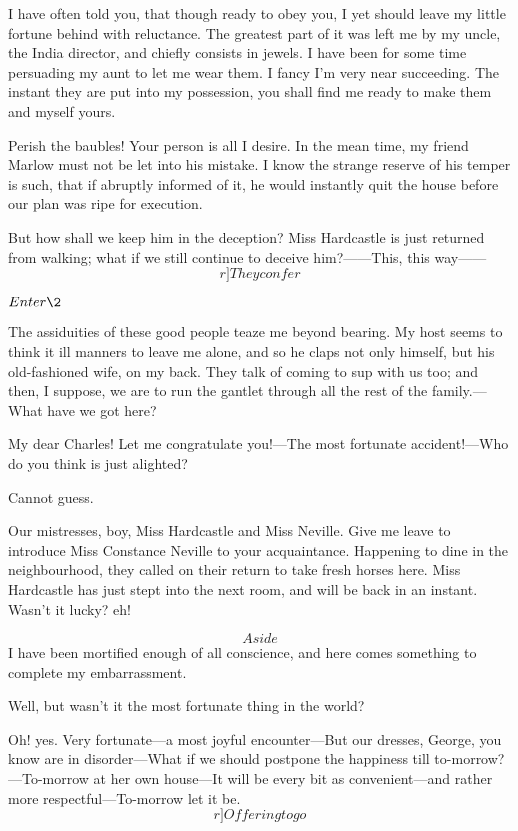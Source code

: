 \documentclass{book}
\begin{document}
\9  I have often told you, that though ready to obey you, I
yet should leave my little fortune behind with reluctance.  The
greatest part of it was left me by my uncle, the India director, and
chiefly consists in jewels.  I have been for some time persuading my
aunt to let me wear them.  I fancy I'm very near succeeding.  The
instant they are put into my possession, you shall find me ready to
make them and myself yours.

\4  Perish the baubles!  Your person is all I desire.  In the
mean time, my friend Marlow must not be let into his mistake.  I know
the strange reserve of his temper is such, that if abruptly informed of
it, he would instantly quit the house before our plan was ripe for
execution.

\9  But how shall we keep him in the deception?  Miss
Hardcastle is just returned from walking; what if we still continue to
deceive him?------This, this way------\[r]They confer\]


\(Enter \2\)


\2  The assiduities of these good people teaze me beyond bearing. 
My host seems to think it ill manners to leave me alone, and so he
claps not only himself, but his old-fashioned wife, on my back.  They
talk of coming to sup with us too; and then, I suppose, we are to run
the gantlet through all the rest of the family.---What have we got here?

\4  My dear Charles!  Let me congratulate you!---The most
fortunate accident!---Who do you think is just alighted?

\2  Cannot guess.

\4  Our mistresses, boy, Miss Hardcastle and Miss Neville. 
Give me leave to introduce Miss Constance Neville to your
acquaintance.  Happening to dine in the neighbourhood, they called on
their return to take fresh horses here.  Miss Hardcastle has just stept
into the next room, and will be back in an instant.  Wasn't it lucky? 
eh!

\2  \[Aside\]  I have been mortified enough of all conscience, and
here comes something to complete my embarrassment.

\4  Well, but wasn't it the most fortunate thing in the world?

\2  Oh! yes.  Very fortunate---a most joyful encounter---But our
dresses, George, you know are in disorder---What if we should postpone
the happiness till to-morrow?---To-morrow at her own house---It will be
every bit as convenient---and rather more re\-spec\-tful---To-morrow let it
be.  \[r]Offering to go\]
\end{document}
